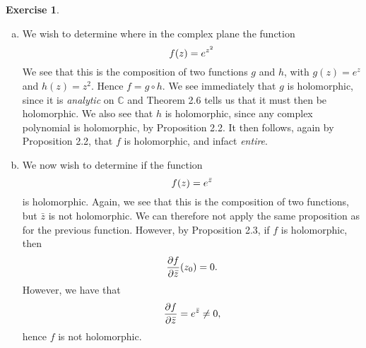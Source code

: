 \documentclass[a4paper]{amsart}
\newcommand{\C}{\mathbb{C}}
\theoremstyle{definition}
\newtheorem{exercise}{Exercise}
\begin{document}
\begin{exercise}\hfill
  \begin{enumerate}[a)]
    \item We wish to determine where in the complex plane the function
      \begin{equation}
        \notag
        f(z) = e^{z^2}
      \end{equation}
      We see that this is the composition of two functions $g$ and $h$, with
      $g(z) = e^z$ and $h(z) = z^2$. Hence $f = g \circ h$.  We see immediately
      that $g$ is holomorphic, since it is \emph{analytic} on $\C$ and Theorem
      2.6 tells us that it must then be holomorphic. We also see that $h$ is
      holomorphic, since any complex polynomial is holomorphic, by Proposition
      2.2. It then follows, again by Proposition 2.2, that $f$ is holomorphic,
      and infact \emph{entire}.
    \clearpage
    \item We now wish to determine if the function
      \begin{equation}
        \notag
        f(z) = e^{\bar{z}}
      \end{equation}
      is holomorphic. Again, we see that this is the composition of two
      functions, but $\bar{z}$ is not holomorphic. We can therefore not apply
      the same proposition as for the previous function. However, by
      Proposition 2.3, if $f$ is holomorphic, then 
      \begin{equation}
        \notag
        \frac{\partial f}{\partial \bar{z}}(z_0) = 0.
      \end{equation}
      However, we have that
      \begin{equation}
        \notag
        \frac{\partial f}{\partial \bar{z}} = e^{\bar{z}} \neq 0, 
      \end{equation}
      hence $f$ is not holomorphic.
  \end{enumerate} 
\end{exercise}
\end{document}
